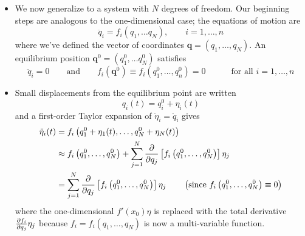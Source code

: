 \documentclass[11pt, a4paper]{article}
\newcommand{\eqtext}[1]{\qquad \text{#1} \qquad}
\begin{document}
\begin{itemize}
	\item We now generalize to a system with $ N $ degrees of freedom.  Our beginning steps are analogous to the one-dimensional case; the equations of motion are
	\begin{equation*}
		\ddot{q}_i = f_i(q_1, \dots q_N), \qquad i = 1, \dots, n
	\end{equation*}
	where we've defined the vector of coordinates $ \bm{q} = (q_{1}, \ldots, q_{N}) $. An equilibrium position $ \bm{q}^{0} =  (q_1^{0}, \dots q_N^{0})$ satisfies
	\begin{equation*}
		\ddot{q}_{i} = 0 \eqtext{and} f_{i}(\bm{q}^{0}) \equiv f_i(q_1^{0}, \ldots, q_n^{0}) = 0 \qquad \quad \text{for all } i = 1, \dots, n
	\end{equation*}
	
	\item Small displacements from the equilibrium point are written
	\begin{equation*}
		q_i(t) = q_i^{0} + \eta_i(t)
	\end{equation*}
	and a first-order Taylor expansion of $ \ddot{\eta}_{i} = \ddot{q}_i $ gives
	\begin{align*}
		\ddot{\eta}_i (t) &= f_i\left (q_1^{0} + \eta_1(t), \ldots, q_N^{0} + \eta_N(t)\right ) \\
		&\approx f_{i}\left (q_1^{0}, \ldots, q_N^{0}\right ) + \sum_{j=1}^{N}\pdv{}{q_j} \left[f_{i}\left (q_1^{0}, \ldots, q_N^{0}\right )\right] \eta_{j} \\
		&= \sum_{j=1}^{N}\pdv{}{q_j} \left[f_{i}\left (q_1^{0}, \ldots, q_N^{0}\right )\right] \eta_{j} \qquad  \left(\text{since } f_{i}\left (q_1^{0}, \ldots, q_N^{0}\right )  \equiv 0\right)
	\end{align*}
	where the one-dimensional $ f'(x_{0})\eta $ is replaced with the total derivative $ \pdv{f_{i}}{q_{j}}\eta_{j} $ because $ f_{i} = f_{i}(q_{1}, \ldots, q_{N})$ is now a multi-variable function.
	

\end{itemize}
\end{document}
